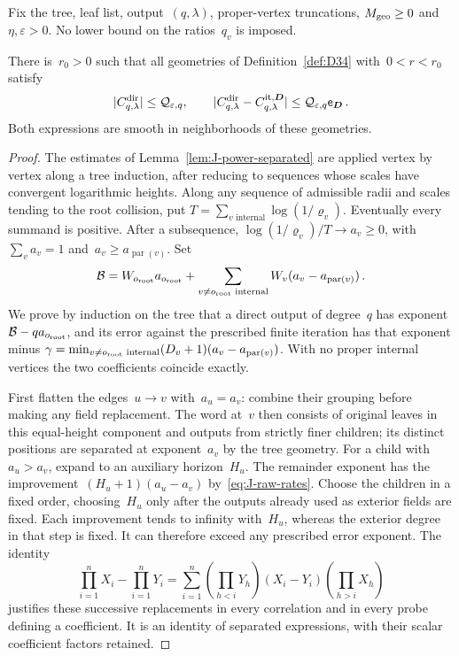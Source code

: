 Fix the tree, leaf list, output~$(q,\lambda)$, proper-vertex truncations, $M_{\rm geo}\ge0$ and~$\eta,\varepsilon>0$. No lower bound on the ratios~$q_v$ is imposed.

\begin{lemma}\label{lem:J1.4}
There is~$r_0>0$ such that all geometries of Definition~\ref{def:D34} with~$0<r<r_0$ satisfy
\begin{equation*}
|C^{\rm dir}_{q,\lambda}|\le\mathcal Q_{\varepsilon,q},\qquad
|C^{\rm dir}_{q,\lambda}-C^{\rm it,\boldsymbol D}_{q,\lambda}|
\le\mathcal Q_{\varepsilon,q}\mathsf e_{\boldsymbol D}\,.
\end{equation*}
Both expressions are smooth in neighborhoods of these geometries.
\end{lemma}

\begin{proof}\label{proof:J1.4-start}
The estimates of Lemma~\ref{lem:J-power-separated} are applied vertex by vertex along a tree induction, after reducing to sequences whose scales have convergent logarithmic heights. Along any sequence of admissible radii and scales tending to the root collision, put $T=\sum_{v\text{ internal}}\log(1/\varrho_v)$. Eventually every summand is positive. After a subsequence, $\log(1/\varrho_v)/T\to a_v\ge0$, with~$\sum_va_v=1$ and~$a_v\ge a_{\operatorname{par}(v)}$. Set
\begin{equation*}
\mathcal B=W_{o_{\rm root}}a_{o_{\rm root}}
+\sum_{v\ne o_{\rm root}\text{ internal}}W_v(a_v-a_{\operatorname{par}(v)})\,.
\end{equation*}
We prove by induction on the tree that a direct output of degree~$q$ has exponent~$\mathcal B-qa_{o_{\rm root}}$, and its error against the prescribed finite iteration has that exponent minus $\gamma=\min_{v\ne o_{\rm root}\text{ internal}}(D_v+1)(a_v-a_{\operatorname{par}(v)})$.
With no proper internal vertices the two coefficients coincide exactly.

First flatten the edges~$u\to v$ with~$a_u=a_v$: combine their grouping before making any field replacement. The word at~$v$ then consists of original leaves in this equal-height component and outputs from strictly finer children; its distinct positions are separated at exponent~$a_v$ by the tree geometry. For a child with~$a_u>a_v$, expand to an auxiliary horizon~$H_u$. The remainder exponent has the improvement~$(H_u+1)(a_u-a_v)$ by~\eqref{eq:J-raw-rates}. Choose the children in a fixed order, choosing~$H_u$ only after the outputs already used as exterior fields are fixed. Each improvement tends to infinity with~$H_u$, whereas the exterior degree in that step is fixed. It can therefore exceed any prescribed error exponent. The identity
\begin{equation}\label{eq:J-telescope}
\prod_{i=1}^nX_i-\prod_{i=1}^nY_i
=\sum_{i=1}^n\left(\prod_{h<i}Y_h\right)(X_i-Y_i)
                    \left(\prod_{h>i}X_h\right)
\end{equation}
justifies these successive replacements in every correlation and in every probe defining a coefficient. It is an identity of separated expressions, with their scalar coefficient factors retained.


\end{proof}

